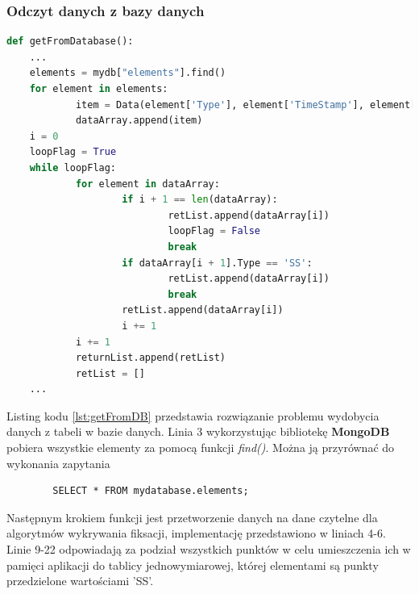 \subsubsection{Odczyt danych z bazy danych}
\label{ssec:getDB}
\begin{lstlisting}[language=Python, caption=Odczyt danych z bazy danych, label={lst:getFromDB}]
def getFromDatabase():
    ...
    elements = mydb["elements"].find()
    for element in elements:
            item = Data(element['Type'], element['TimeStamp'], element['CoordX'], element['CoordY'])
            dataArray.append(item)
    i = 0
    loopFlag = True
    while loopFlag:
            for element in dataArray:
                    if i + 1 == len(dataArray):
                            retList.append(dataArray[i])
                            loopFlag = False
                            break
                    if dataArray[i + 1].Type == 'SS':
                            retList.append(dataArray[i])
                            break
                    retList.append(dataArray[i])
                    i += 1
            i += 1
            returnList.append(retList)
            retList = []
    ...
    \end{lstlisting}
Listing kodu \ref{lst:getFromDB} przedstawia rozwiązanie problemu wydobycia danych z tabeli w bazie danych. Linia 3 wykorzystując bibliotekę \textbf{MongoDB} pobiera wszystkie elementy za pomocą funkcji \emph{find()}. Można ją przyrównać do wykonania zapytania 
\begin{verbatim}
        SELECT * FROM mydatabase.elements;
\end{verbatim}
Następnym krokiem funkcji jest przetworzenie danych na dane czytelne dla algorytmów wykrywania fiksacji, implementację przedstawiono w liniach 4-6. Linie 9-22 odpowiadają za podział wszystkich punktów w celu umieszczenia ich w pamięci aplikacji do tablicy jednowymiarowej, której elementami są punkty przedzielone wartościami 'SS'.
